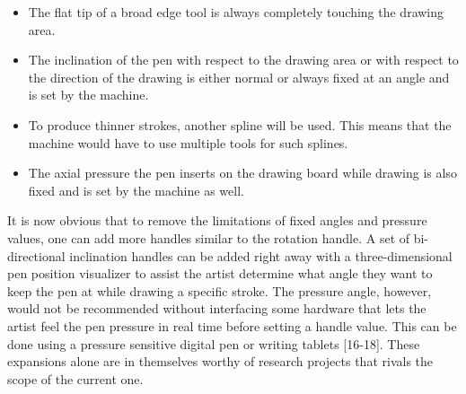     \begin{itemize}
        \item The flat tip of a broad edge tool is always completely touching the drawing area.
    	\item The inclination of the pen with respect to the drawing area or with respect to the direction of the drawing is either normal or always fixed at an angle and is set by the machine.
    	\item To produce thinner strokes, another spline will be used. This means that the machine would have to use multiple tools for such splines.
    	\item The axial pressure the pen inserts on the drawing board while drawing is also fixed and is set by the machine as well.
    
    \end{itemize}

    It is now obvious that to remove the limitations of fixed angles and pressure values, one can add more handles similar to the rotation handle. A set of bi-directional inclination handles can be added right away with a three-dimensional pen position visualizer to assist the artist determine what angle they want to keep the pen at while drawing a specific stroke. The pressure angle, however, would not be recommended without interfacing some hardware that lets the artist feel the pen pressure in real time before setting a handle value. This can be done using a pressure sensitive digital pen or writing tablets [16-18]. These expansions alone are in themselves worthy of research projects that rivals the scope of the current one.
